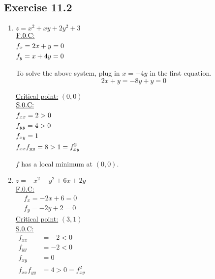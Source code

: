 \documentclass{./../../Latex/homework}
\begin{document}
\thispagestyle{plain}

\subsection*{Exercise 11.2}
\begin{enumerate}

\item  $z=x^{2}+x y+2 y^{2}+3$ \\

$
\begin{aligned}
&\text {\underline{F.0.C:} } \\
&f_{x}=2 x+y=0 \\
&f_{y}=x+4 y=0
\end{aligned} \\
$

To solve the above system, plug in $x=-4 y$ in the first equation.
$$ 2 x+y=-8 y+y=0 $$

\underline{Critical point:} $(0,0)$ \\

$
\begin{aligned}
&\text {\underline{S.0.C:} } \\
&f_{x x}=2>0 \\
&f_{y y}=4>0 \\
&f_{x y}=1 \\
&f_{x x} f_{y y}=8>1=f_{x y}^{2}
\end{aligned} \\
$

$f$ has a local minimum at $(0,0)$. \\

\item $z=-x^{2}-y^{2}+6 x+2 y$ \\
 
 \underline{F.0.C:} \\
 $
 \begin{aligned}
&f_{x}=-2 x+6=0 \\
&f_{y}=-2 y+2=0
\end{aligned}
$ \\

\underline{Critical point:} $(3,1)$ \\

 \underline{S.0.C:} \\

$
\begin{aligned}
f_{x x} &=-2<0 \\
f_{y y} &=-2<0 \\
f_{x y} &=0 \\
f_{x x} f_{y y} &=4>0=f_{x y}^{2}
\end{aligned}
$ \\


\end{enumerate}
\end{document}
